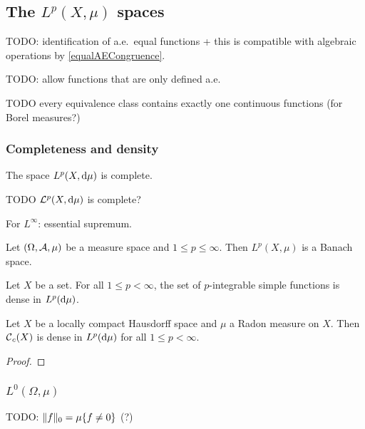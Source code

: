 \subsection{The $L^p(X,\mu)$ spaces}
TODO: identification of a.e.\ equal functions + this is compatible with algebraic operations by \ref{equalAECongruence}.

TODO: allow functions that are only defined a.e.

\begin{proposition}
TODO every equivalence class contains exactly one continuous functions (for Borel measures?)
\end{proposition}

\subsubsection{Completeness and density}

\begin{theorem}
The space $L^p(X,\operatorname{d \!}{\mu})$ is complete.
\end{theorem}
TODO $\mathcal{L}^p(X,\operatorname{d \!}{\mu})$ is complete?

For $L^\infty$: essential supremum.

\begin{proposition}
Let $\sSet{\Omega, \mathcal{A}, \mu}$ be a measure space and $1\leq p \leq \infty$. Then $L^p(X,\mu)$ is a Banach space.
\end{proposition}

\begin{proposition}
Let $X$ be a set. For all $1\leq p < \infty$, the set of $p$-integrable simple functions is dense in $L^p(\operatorname{d \!}{\mu})$.
\end{proposition}


\begin{proposition}
Let $X$ be a locally compact Hausdorff space and $\mu$ a Radon measure on $X$. Then $\operatorname{\mathcal{C}}_c(X)$ is dense in $L^p(\operatorname{d \!}{\mu})$ for all $1\leq p < \infty$.
\end{proposition}
\begin{proof}

\end{proof}





\subsubsection{$L^0(\Omega, \mu)$}
TODO: $\lVert f\rVert_0 = \mu\{f\neq 0\}$ (?)


